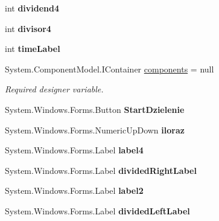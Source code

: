 \begin{DoxyCompactItemize}
int {\bfseries dividend4}
\item 
\mbox{\label{class_quiz___matematyczny_1_1_dzielenie_a005118a4c6a64736c77066baa498ffb1}} 
int {\bfseries divisor4}
\item 
\mbox{\label{class_quiz___matematyczny_1_1_dzielenie_ac3cbca067243813131d30f5198b66fc2}} 
int {\bfseries time\+Label}
\item 
System.\+Component\+Model.\+I\+Container \mbox{\hyperlink{class_quiz___matematyczny_1_1_dzielenie_a3cc142e70c350e27207c361550253a70}{components}} = null
\begin{DoxyCompactList}\small\item\em Required designer variable. \end{DoxyCompactList}\item 
\mbox{\label{class_quiz___matematyczny_1_1_dzielenie_a95cacd2930ef847e7d0cad452a997c21}} 
System.\+Windows.\+Forms.\+Button {\bfseries Start\+Dzielenie}
\item 
\mbox{\label{class_quiz___matematyczny_1_1_dzielenie_a12e4d6a8fa922d42d1f348b000ff5e1b}} 
System.\+Windows.\+Forms.\+Numeric\+Up\+Down {\bfseries iloraz}
\item 
\mbox{\label{class_quiz___matematyczny_1_1_dzielenie_ae2d99f42945e67719954cf4b1ebc5fb4}} 
System.\+Windows.\+Forms.\+Label {\bfseries label4}
\item 
\mbox{\label{class_quiz___matematyczny_1_1_dzielenie_a8d21b48bd647e301458591fb96b51157}} 
System.\+Windows.\+Forms.\+Label {\bfseries divided\+Right\+Label}
\item 
\mbox{\label{class_quiz___matematyczny_1_1_dzielenie_ae2fd177dd418dc7e7dd026b16ddb13d2}} 
System.\+Windows.\+Forms.\+Label {\bfseries label2}
\item 
\mbox{\label{class_quiz___matematyczny_1_1_dzielenie_a8b0be198dfbec5e84b7e7cae71092891}} 
System.\+Windows.\+Forms.\+Label {\bfseries divided\+Left\+Label}

\end{DoxyCompactItemize}
